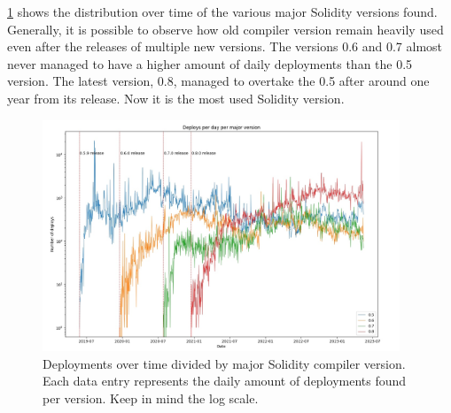 \cref{fig:deploys-per-solidity-version} shows the distribution over time of the various major Solidity versions found. 
Generally, it is possible to observe how old compiler version remain heavily used even after the releases of multiple new versions.
The versions 0.6 and 0.7 almost never managed to have a higher amount of daily deployments than the 0.5 version.
The latest version, 0.8, managed to overtake the 0.5 after around one year from its release. Now it is the most used Solidity version.

\begin{figure}[ht]
    \centering
    \includegraphics[width=0.95\textwidth]{Figures/analysis/deploys_per_day_per_major.jpg}
    \caption{Deployments over time divided by major Solidity compiler version. Each data entry represents the daily amount of deployments found per version. Keep in mind the log scale.}
    \label{fig:deploys-per-solidity-version}
\end{figure}




